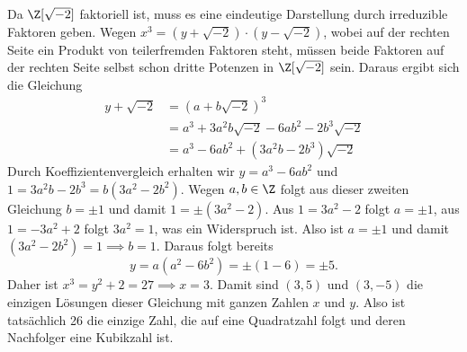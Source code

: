 \documentclass{article}
\begin{document}
\begin{enumerate}[(a)]
        Da $\Z[\sqrt{-2}]$ faktoriell ist, muss es eine eindeutige Darstellung durch irreduzible Faktoren geben. Wegen $x^3 = (y + \sqrt{-2}) \cdot (y - \sqrt{-2})$, wobei auf der rechten Seite ein Produkt von teilerfremden Faktoren steht, müssen beide Faktoren auf der rechten Seite selbst schon dritte Potenzen in $\Z[\sqrt{-2}]$ sein. Daraus ergibt sich die Gleichung
        \begin{align*}
            y + \sqrt{-2} &= (a + b\sqrt{-2})^3\\
            &= a^3 + 3a^2b\sqrt{-2} -6ab^2 -2 b^3\sqrt{-2}\\
            &= a^3 - 6ab^2 + (3a^2b - 2b^3)\sqrt{-2}
        \end{align*}
        Durch Koeffizientenvergleich erhalten wir $y = a^3 - 6ab^2$ und $1 = 3a^2b - 2b^3 = b(3a^2 - 2b^2)$. Wegen $a,b\in \Z$ folgt aus dieser zweiten Gleichung $b = \pm 1$ und damit $1 = \pm (3a^2 - 2)$. Aus $1 = 3a^2 - 2$ folgt $a = \pm 1$, aus $1 = -3a^2 + 2$ folgt $3a^2 = 1$, was ein Widerspruch ist. Also ist $a = \pm 1$ und damit $(3a^2 - 2b^2) = 1 \implies b = 1$. Daraus folgt bereits 
        \[
            y = a(a^2 - 6b^2) = \pm (1 - 6) = \pm 5.  
        \]
        Daher ist $x^3 = y^2 + 2 = 27 \implies x = 3$. Damit sind $(3,5)$ und $(3,-5)$ die einzigen Lösungen dieser Gleichung mit ganzen Zahlen $x$ und $y$. Also ist tatsächlich 26 die einzige Zahl, die auf eine Quadratzahl folgt und deren Nachfolger eine Kubikzahl ist.
    \end{enumerate}
\end{document}
